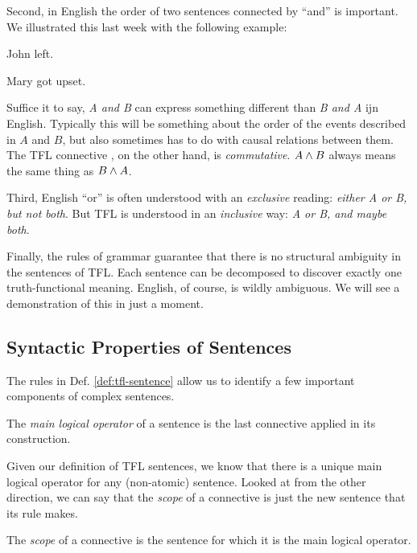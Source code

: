 Second, in English the order of two sentences connected by ``and'' is important.
We illustrated this last week with the following example:

\begin{argument}
\item[A:] John left.
\item[B:] Mary got upset.
\end{argument}

Suffice it to say, \emph{A and B} can express something different than
\emph{B and A} ijn English. Typically this will be something about the order
of the events described in $A$ and $B$, but also sometimes has to do with
causal relations between them. The TFL connective \eand, on the other hand,
is \emph{commutative}. $A\wedge B$ always means the same thing as $B\wedge A$.

Third, English ``or'' is often understood with an \emph{exclusive} reading:
\emph{either A or B, but not both}. But TFL \sor is understood in an
\emph{inclusive} way: \emph{A or B, and maybe both}.

Finally, the rules of grammar guarantee that there is no structural ambiguity
in the sentences of TFL. Each sentence can be decomposed to discover exactly
one truth-functional meaning. English, of course, is wildly ambiguous. We will
see a demonstration of this in just a moment.

\subsection{Syntactic Properties of Sentences}

The rules in Def. \ref{def:tfl-sentence} allow us to identify a few important
components of complex sentences.

\begin{definition}
  \label{def:tfl-main-operator}
  The \emph{main logical operator} of a sentence is the last connective applied
  in its construction.
\end{definition}

Given our definition of TFL sentences, we know that there is a unique main
logical operator for any (non-atomic) sentence. Looked at from the other
direction, we can say that the \emph{scope} of a connective is just the new
sentence that its rule makes.

\begin{definition}
  \label{def:tfl-connective-scope}
  The \emph{scope} of a connective is the sentence for which it is the main
  logical operator.
\end{definition}

